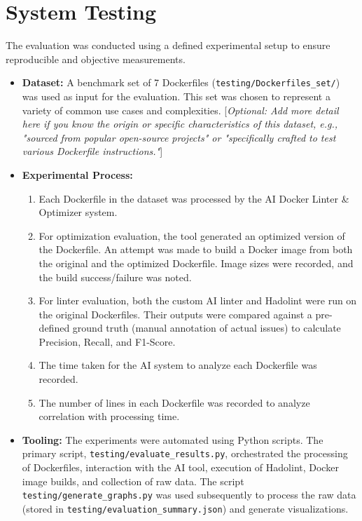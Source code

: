 \section{System Testing}
\label{sec:eval_setup}
The evaluation was conducted using a defined experimental setup to ensure reproducible and objective measurements.

\begin{itemize}
    \item \textbf{Dataset:} A benchmark set of 7 Dockerfiles (\texttt{testing/Dockerfiles\_set/}) was used as input for the evaluation. This set was chosen to represent a variety of common use cases and complexities. [\emph{Optional: Add more detail here if you know the origin or specific characteristics of this dataset, e.g., "sourced from popular open-source projects" or "specifically crafted to test various Dockerfile instructions."}]
    \item \textbf{Experimental Process:}
        \begin{enumerate}
            \item Each Dockerfile in the dataset was processed by the AI Docker Linter \& Optimizer system.
            \item For optimization evaluation, the tool generated an optimized version of the Dockerfile. An attempt was made to build a Docker image from both the original and the optimized Dockerfile. Image sizes were recorded, and the build success/failure was noted.
            \item For linter evaluation, both the custom AI linter and Hadolint were run on the original Dockerfiles. Their outputs were compared against a pre-defined ground truth (manual annotation of actual issues) to calculate Precision, Recall, and F1-Score.
            \item The time taken for the AI system to analyze each Dockerfile was recorded.
            \item The number of lines in each Dockerfile was recorded to analyze correlation with processing time.
        \end{enumerate}
    \item \textbf{Tooling:} The experiments were automated using Python scripts. The primary script, \texttt{testing/evaluate\_results.py}, orchestrated the processing of Dockerfiles, interaction with the AI tool, execution of Hadolint, Docker image builds, and collection of raw data. The script \texttt{testing/generate\_graphs.py} was used subsequently to process the raw data (stored in \texttt{testing/evaluation\_summary.json}) and generate visualizations.
\end{itemize}

